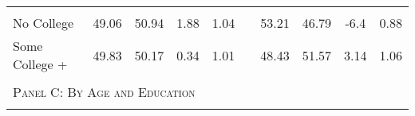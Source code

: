 \begin{table}[htpb!]
\begin{center}
{\begin{tabular}{lccccp{6mm}cccc}
\begin{footnotesize}\end{footnotesize}& 
\begin{footnotesize}\end{footnotesize}& 
\begin{footnotesize}\end{footnotesize}& 
\begin{footnotesize}\end{footnotesize}& 
\begin{footnotesize}\end{footnotesize}& 
\begin{footnotesize}\end{footnotesize}& 
\begin{footnotesize}\end{footnotesize}& 
\begin{footnotesize}\end{footnotesize}\\ 
No College&49.06&50.94&1.88&1.04
&&53.21&46.79&-6.4&0.88
\\ 
Some College +&49.83&50.17&0.34&1.01
&&48.43&51.57&3.14&1.06
\\ 
 &&&&&&&&& \\\multicolumn{10}{l}{\textsc{Panel C: By Age and Education}}\\
\begin{footnotesize}\end{footnotesize}& 
\begin{footnotesize}\end{footnotesize}& 
\begin{footnotesize}\end{footnotesize}& 
\begin{footnotesize}\end{footnotesize}& 
\begin{footnotesize}\end{footnotesize}& 
\begin{footnotesize}\end{footnotesize}& 
\begin{footnotesize}\end{footnotesize}& 
\begin{footnotesize}\end{footnotesize}& 
\begin{footnotesize}\end{footnotesize}& 
\begin{footnotesize}\end{footnotesize}\\ 

\end{tabular}}
\end{center}
\end{table}
